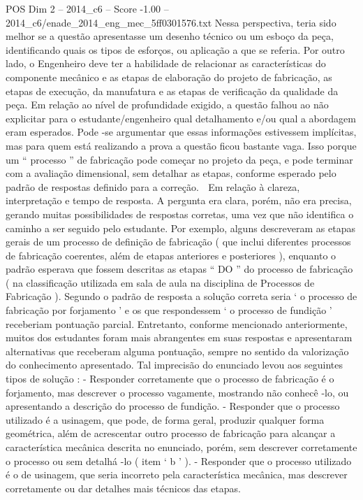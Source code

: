 \begin{textsample}{POS Dim 2 – 2014\_c6 – Score -1.00 – 2014\_c6/enade\_2014\_eng\_mec\_5ff0301576.txt}
Nessa perspectiva, teria sido melhor se a questão apresentasse um desenho técnico ou um esboço da peça, identificando quais os tipos de esforços, ou aplicação a que se referia.
Por outro lado, o Engenheiro deve ter a habilidade de relacionar as características do componente mecânico e as etapas de elaboração do projeto de fabricação, as etapas de execução, da manufatura e as etapas de verificação da qualidade da peça.
Em relação ao nível de profundidade exigido, a questão falhou ao não explicitar para o estudante/engenheiro qual detalhamento e/ou qual a abordagem eram esperados.
Pode -se argumentar que essas informações estivessem implícitas, mas para quem está realizando a prova a questão ficou bastante vaga.
Isso porque um “ processo ” de fabricação pode começar no projeto da peça, e pode terminar com a avaliação dimensional, sem detalhar as etapas, conforme esperado pelo padrão de respostas definido para a correção.  Em relação à clareza, interpretação e tempo de resposta.
A pergunta era clara, porém, não era precisa, gerando muitas possibilidades de respostas corretas, uma vez que não identifica o caminho a ser seguido pelo estudante.
Por exemplo, alguns descreveram as etapas gerais de um processo de definição de fabricação ( que inclui diferentes processos de fabricação coerentes, além de etapas anteriores e posteriores ), enquanto o padrão esperava que fossem descritas as etapas “ DO ” do processo de fabricação ( na classificação utilizada em sala de aula na disciplina de Processos de Fabricação ).
Segundo o padrão de resposta a solução correta seria ‘ o processo de fabricação por forjamento ’ e os que respondessem ‘ o processo de fundição ’ receberiam pontuação parcial.
Entretanto, conforme mencionado anteriormente, muitos dos estudantes foram mais abrangentes em suas respostas e apresentaram alternativas que receberam alguma pontuação, sempre no sentido da valorização do conhecimento apresentado.
Tal imprecisão do enunciado levou aos seguintes tipos de solução : - Responder corretamente que o processo de fabricação é o forjamento, mas descrever o processo vagamente, mostrando não conhecê -lo, ou apresentando a descrição do processo de fundição. - Responder que o processo utilizado é a usinagem, que pode, de forma geral, produzir qualquer forma geométrica, além de acrescentar outro processo de fabricação para alcançar a característica mecânica descrita no enunciado, porém, sem descrever corretamente o processo ou sem detalhá -lo ( item ‘ b ’ ). - Responder que o processo utilizado é o de usinagem, que seria incorreto pela característica mecânica, mas descrever corretamente ou dar detalhes mais técnicos das etapas.

\end{textsample}
